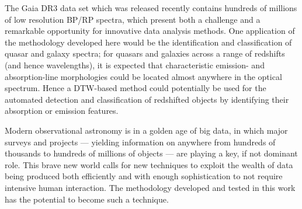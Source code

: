 The Gaia DR3 data set which was released recently \citep{2021} contains hundreds of millions of low resolution BP/RP spectra, which present both a challenge and a remarkable opportunity for innovative data analysis methods. One application of the methodology developed here would be the identification and classification of quasar and galaxy spectra; for quasars and galaxies across a range of redshifts (and hence wavelengths), it is expected that characteristic emission- and absorption-line morphologies could be located almost anywhere in the optical spectrum. Hence a DTW-based method could potentially be used for the automated detection and classification of redshifted objects by identifying their absorption or emission features.


Modern observational astronomy is in a golden age of big data, in which major surveys and projects — yielding information on anywhere from hundreds of thousands to hundreds of millions of objects — are playing a key, if not dominant role. This brave new world calls for new techniques to exploit the wealth of data being produced both efficiently and with enough sophistication to not require intensive human interaction. The methodology developed and tested in this work has the potential to become such a technique.